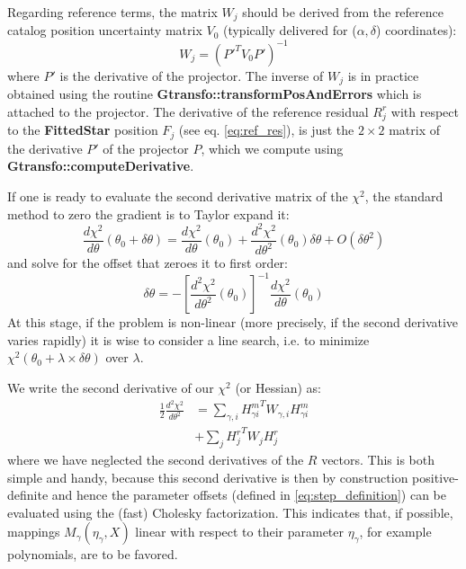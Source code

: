 \documentclass[a4paper,12pt]{scrartcl}
\newcommand{\ClName}[1]{{\bf #1}}
\def\bf{\normalfont\bfseries}
\begin{document}
Regarding reference terms, the matrix $W_j$ should be derived from
the reference catalog position uncertainty matrix $V_0$ (typically
delivered for ($\alpha,\delta$) coordinates):
\begin{equation*}
W_j = (P'^T V_0 P')^{-1}
\end{equation*}
where $P'$ is the derivative of the projector. The inverse of $W_j$ is
in practice obtained using the routine
\ClName{Gtransfo::transformPosAndErrors} which is attached to the
projector. The derivative of the reference residual $R^r_{j}$ with respect to
the \ClName{FittedStar} position $F_j$ (see eq. \ref{eq:ref_res}),
is just the $2\times 2$ matrix of the derivative
$P'$ of the projector $P$, which we compute using \ClName{Gtransfo::computeDerivative}.


If one is ready to evaluate the second derivative matrix of the
$\chi^2$, the standard method to zero the gradient
is to Taylor expand it:
$$
\frac{d \chi^2}{d \theta}(\theta_0+\delta\theta) = \frac{d \chi^2}{d \theta}(\theta_0) + \frac{d^2 \chi^2}{d \theta^2}(\theta_0)\delta\theta + O(\delta\theta^2)
$$  
and solve for the offset that zeroes it to first order:
\begin{equation}
\delta\theta =  - \left[ \frac{d^2 \chi^2}{d \theta^2}(\theta_0) \right]^{-1}  \frac{d \chi^2}{d \theta}(\theta_0) \label{eq:step_definition}
\end{equation}
At this stage, if the problem is non-linear (more precisely, if the
second derivative varies rapidly) it is wise to consider a line
search, i.e. to minimize $\chi^2(\theta_0 + \lambda\times
\delta\theta)$ over $\lambda$.

We write the second derivative of our $\chi^2$ (or Hessian) as:
\begin{align}
\frac{1}{2} \frac{d^2 \chi^2}{d \theta^2} & =  \sum_{\gamma,i}  {H^m_{\gamma i}}^T W_{\gamma,i}  H^m_{\gamma i} \nonumber \\
         & +\sum_j {H^r_{j}}^T W_{j}  H^r_{j} \label{eq:def_hessian}
\end{align}
where we have neglected the second derivatives of the $R$
vectors. This is both simple and handy, because this second derivative
is then by construction positive-definite and hence the parameter
offsets (defined in \ref{eq:step_definition}) can be evaluated using
the (fast) Cholesky factorization. This indicates that, if possible,
mappings $M_\gamma(\eta_\gamma,X)$ linear with respect to their
parameter $\eta_\gamma$, for example polynomials, are to be favored.
\end{document}
